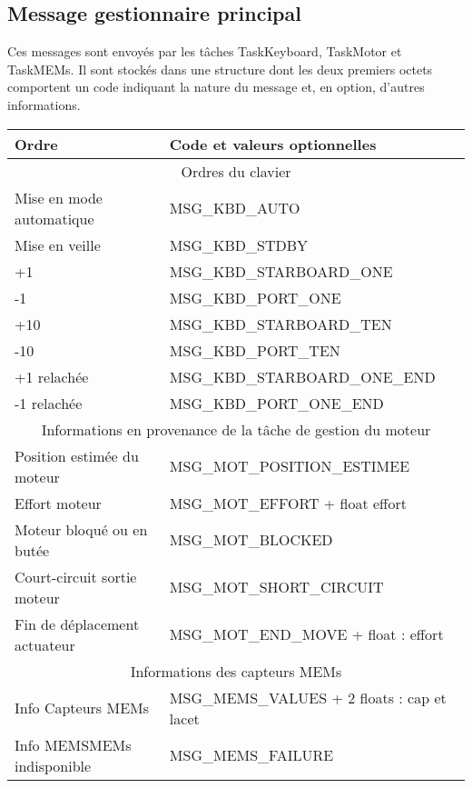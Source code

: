 \documentclass[a4paper,11pt]{report}
\begin{document}
\subsection{Message gestionnaire principal}
Ces messages sont envoyés par les tâches TaskKeyboard, TaskMotor et TaskMEMs.
Il sont stockés dans une structure dont les deux premiers octets comportent
un code indiquant la nature du message et, en option, d'autres informations.
\\
\begin{tabular}{|l|l|}
\hline 
Ordre & Code et valeurs optionnelles \\
\hline
\multicolumn{2}{|c|}{Ordres du clavier} \\
\hline 
Mise en mode automatique & MSG\_KBD\_AUTO \\ 
Mise en veille & MSG\_KBD\_STDBY \\ 
+1 & MSG\_KBD\_STARBOARD\_ONE \\ 
-1 & MSG\_KBD\_PORT\_ONE \\ 
+10 & MSG\_KBD\_STARBOARD\_TEN \\ 
-10 & MSG\_KBD\_PORT\_TEN \\ 
+1 relachée & MSG\_KBD\_STARBOARD\_ONE\_END \\ 
-1 relachée & MSG\_KBD\_PORT\_ONE\_END \\ 
\hline 
\multicolumn{2}{|c|}{Informations en provenance de la tâche de gestion du moteur} \\
\hline
Position estimée du moteur & MSG\_MOT\_POSITION\_ESTIMEE \\
Effort moteur & MSG\_MOT\_EFFORT + float effort\\ 
Moteur bloqué ou en butée & MSG\_MOT\_BLOCKED \\
Court-circuit sortie moteur & MSG\_MOT\_SHORT\_CIRCUIT \\
Fin de déplacement actuateur & MSG\_MOT\_END\_MOVE + float : effort \\
\hline
\multicolumn{2}{|c|}{Informations des capteurs MEMs}\\
\hline
Info Capteurs MEMs & MSG\_MEMS\_VALUES + 2 floats : cap et lacet \\
Info \gls{MEMS}MEMs indisponible & MSG\_MEMS\_FAILURE \\

\hline
\end{tabular} 
\end{document}
